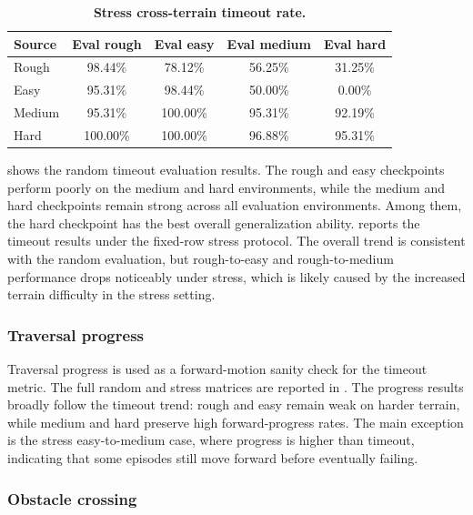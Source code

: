 \documentclass{article}
\begin{document}
\begin{table}[t]
    \caption{\textbf{Stress cross-terrain timeout rate.}}
    \label{tab:stress-cross-timeout}
    \centering
    \begin{tabular}{lcccc}
        \toprule
        Source & Eval rough & Eval easy & Eval medium & Eval hard \\
        \midrule
        Rough & 98.44\% & 78.12\% & 56.25\% & 31.25\% \\
        Easy & 95.31\% & 98.44\% & 50.00\% & 0.00\% \\
        Medium & 95.31\% & 100.00\% & 95.31\% & 92.19\% \\
        Hard & 100.00\% & 100.00\% & 96.88\% & 95.31\% \\
        \bottomrule
    \end{tabular}
\end{table}

 shows the random timeout evaluation results. The rough and easy checkpoints perform poorly on the medium and hard environments, while the medium and hard checkpoints remain strong across all evaluation environments. Among them, the hard checkpoint has the best overall generalization ability.  reports the timeout results under the fixed-row stress protocol. The overall trend is consistent with the random evaluation, but rough-to-easy and rough-to-medium performance drops noticeably under stress, which is likely caused by the increased terrain difficulty in the stress setting.

\subsubsection{Traversal progress}

Traversal progress is used as a forward-motion sanity check for the timeout metric. The full random and stress matrices are reported in . The progress results broadly follow the timeout trend: rough and easy remain weak on harder terrain, while medium and hard preserve high forward-progress rates. The main exception is the stress easy-to-medium case, where progress is higher than timeout, indicating that some episodes still move forward before eventually failing.

\subsubsection{Obstacle crossing}
\end{document}
